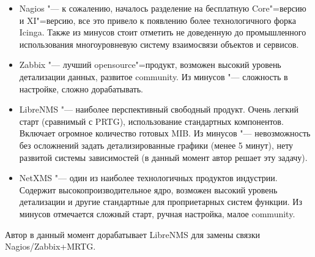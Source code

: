 \documentclass[10pt, a5paper]{article}
\begin{document}
\begin{itemize}
  \item Nagios "--- к сожалению, началось разделение на бесплатную Core"=версию и XI"=версию, все это привело к появлению более технологичного форка Icinga. Также из минусов стоит отметить не доведенную до промышленного использования многоуровневую систему взаимосвязи объектов и сервисов.
  \item Zabbix "--- лучший opensource"=продукт, возможен высокий уровень детализации данных, развитое community. Из минусов "--- сложность в настройке, сложно дорабатывать.
  \item LibreNMS "--- наиболее перспективный свободный продукт. \linebreak Очень легкий старт (сравнимый с PRTG), использование стандартных компонентов. Включает огромное количество готовых MIB. Из минусов "--- невозможность без осложнений задать детализированные графики (менее 5 минут), нету развитой системы зависимостей (в данный момент автор решает эту задачу).
  \item NetXMS "--- один из наиболее технологичных продуктов индустрии. Содержит высокопроизводительное ядро, возможен высокий уровень детализации и другие стандартные для проприетарных систем функции. Из минусов отмечается сложный старт, ручная настройка, малое community.
\end{itemize}

Автор в данный момент дорабатывает LibreNMS для замены связки Nagios/Zabbix+MRTG.
\end{document}
